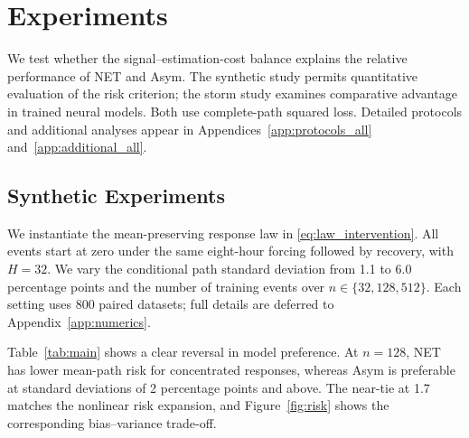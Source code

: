\section{Experiments}
We test whether the signal--estimation-cost balance explains the relative performance of NET and Asym. The synthetic study permits quantitative evaluation of the risk criterion; the storm study examines comparative advantage in trained neural models. Both use complete-path squared loss. Detailed protocols and additional analyses appear in Appendices~\ref{app:protocols_all} and~\ref{app:additional_all}.

\subsection{Synthetic Experiments}
We instantiate the mean-preserving response law in \eqref{eq:law_intervention}. All events start at zero under the same eight-hour forcing followed by recovery, with $H=32$. We vary the conditional path standard deviation from 1.1 to 6.0 percentage points and the number of training events over $n\in\{32,128,512\}$. Each setting uses 800 paired datasets; full details are deferred to Appendix~\ref{app:numerics}.

Table~\ref{tab:main} shows a clear reversal in model preference. At $n=128$, NET has lower mean-path risk for concentrated responses, whereas Asym is preferable at standard deviations of 2 percentage points and above. The near-tie at 1.7 matches the nonlinear risk expansion, and Figure~\ref{fig:risk} shows the corresponding bias--variance trade-off.

